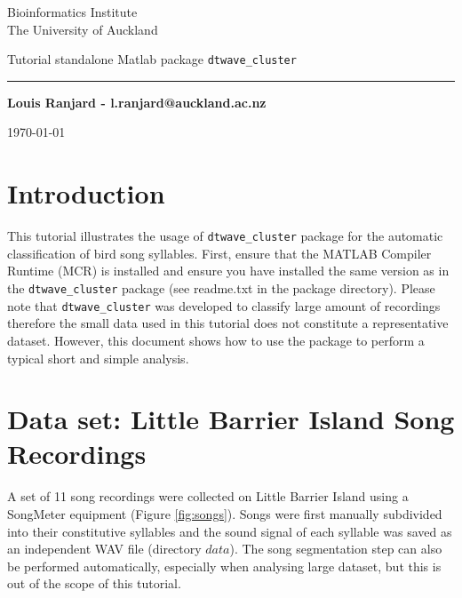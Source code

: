 \documentclass[a4paper]{article}
\begin{document}
\thispagestyle{empty}
\begin{minipage}{0.6\linewidth}
\begin{large}
Bioinformatics Institute\\
The University of Auckland\\
\end{large}
\end{minipage}


\begin{center} 
\vspace{270 pt}
\begin{Huge}
Tutorial standalone Matlab package \texttt{dtwave\_cluster}\\
\vspace{2pt}
\hrule
\end{Huge}
\end{center}
\begin{flushright}
\begin{Large}
\textbf{Louis Ranjard - l.ranjard@auckland.ac.nz}\\
\end{Large}
\end{flushright}
\vspace{250pt}
\begin{center}
\today
\end{center}
\vspace{35pt}
\newpage


\section*{Introduction}
This tutorial illustrates the usage of \texttt{dtwave\_cluster} package for the automatic classification of bird song syllables.
First, ensure that the MATLAB Compiler Runtime (MCR) is installed and ensure you have installed the same version as in the \texttt{dtwave\_cluster} package (see readme.txt in the package directory). 
Please note that \texttt{dtwave\_cluster} was developed to classify large amount of recordings \cite{ranjard} therefore the small data used in this tutorial does not constitute a representative dataset.
However, this document shows how to use the package to perform a typical short and simple analysis.

\setlength\abovecaptionskip{-12pt}
\section{Data set: Little Barrier Island Song Recordings}
A set of 11 song recordings were collected on Little Barrier Island using a SongMeter equipment (Figure \ref{fig:songs}).
Songs were first manually subdivided into their constitutive syllables and the sound signal of each syllable was saved as an independent WAV file (directory \(data\)).
The song segmentation step can also be performed automatically, especially when analysing large dataset, but this is out of the scope of this tutorial.
\end{document}
